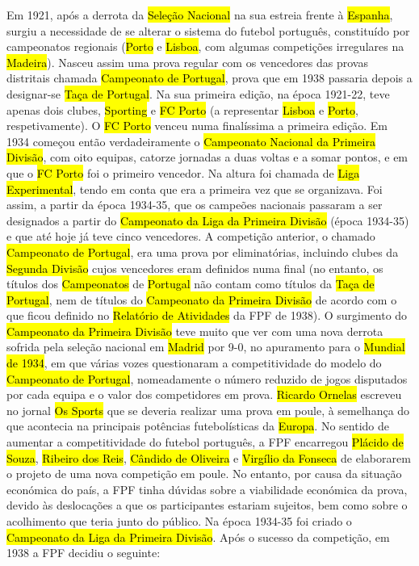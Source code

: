 \documentclass[a4paper,12pt]{article}
\begin{document}
Em 1921, após a derrota da \hl{Seleção Nacional} na sua estreia frente à \hl{Espanha}, surgiu a necessidade de se alterar o sistema do futebol português, constituído por campeonatos regionais (\hl{Porto} e \hl{Lisboa}, com algumas competições irregulares na \hl{Madeira}). Nasceu assim uma prova regular com os vencedores das provas distritais chamada \hl{Campeonato de Portugal}, prova que em 1938 passaria depois a designar-se \hl{Taça de Portugal}. Na sua primeira edição, na época 1921-22, teve apenas dois clubes, \hl{Sporting} e \hl{FC Porto} (a representar \hl{Lisboa} e \hl{Porto}, respetivamente). O \hl{FC Porto} venceu numa finalíssima a primeira edição. Em 1934 começou então verdadeiramente o \hl{Campeonato Nacional da Primeira Divisão}, com oito equipas, catorze jornadas a duas voltas e a somar pontos, e em que o \hl{FC Porto} foi o primeiro vencedor. Na altura foi chamada de \hl{Liga Experimental}, tendo em conta que era a primeira vez que se organizava. Foi assim, a partir da época 1934-35, que os campeões nacionais passaram a ser designados a partir do \hl{Campeonato da Liga da Primeira Divisão} (época 1934-35) e que até hoje já teve cinco vencedores. A competição anterior, o chamado \hl{Campeonato de Portugal}, era uma prova por eliminatórias, incluindo clubes da \hl{Segunda Divisão} cujos vencedores eram definidos numa final (no entanto, os títulos dos \hl{Campeonatos} de \hl{Portugal} não contam como títulos da \hl{Taça de Portugal}, nem de títulos do \hl{Campeonato da Primeira Divisão} de acordo com o que ficou definido no \hl{Relatório de Atividades} da FPF de 1938).
O surgimento do \hl{Campeonato da Primeira Divisão} teve muito que ver com uma nova derrota sofrida pela seleção nacional em \hl{Madrid} por 9-0, no apuramento para o \hl{Mundial de 1934}, em que várias vozes questionaram a competitividade do modelo do \hl{Campeonato de Portugal}, nomeadamente o número reduzido de jogos disputados por cada equipa e o valor dos competidores em prova. \hl{Ricardo Ornelas} escreveu no jornal \hl{Os Sports} que se deveria realizar uma prova em poule, à semelhança do que acontecia na principais potências futebolísticas da \hl{Europa}. No sentido de aumentar a competitividade do futebol português, a FPF encarregou \hl{Plácido de Souza}, \hl{Ribeiro dos Reis}, \hl{Cândido de Oliveira} e \hl{Virgílio da Fonseca} de elaborarem o projeto de uma nova competição em poule. No entanto, por causa da situação económica do país, a FPF tinha dúvidas sobre a viabilidade económica da prova, devido às deslocações a que os participantes estariam sujeitos, bem como sobre o acolhimento que teria junto do público. Na época 1934-35 foi criado o \hl{Campeonato da Liga da Primeira Divisão}. Após o sucesso da competição, em 1938 a FPF decidiu o seguinte:
\end{document}
